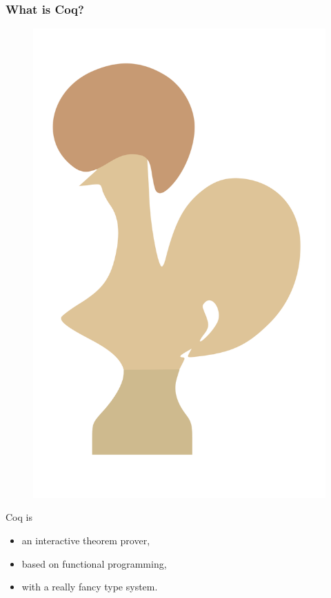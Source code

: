 \documentclass{beamer}
\begin{document}
\begin{frame}
  \frametitle{What is Coq?}

  \begin{figure}
    \includegraphics[height=0.4\textheight]{coq}
  \end{figure}

  Coq is
  \begin{itemize}
  \item an interactive theorem prover,
  \item based on functional programming,
  \item with a really fancy type system.
  \end{itemize}
\end{frame}
\end{document}

